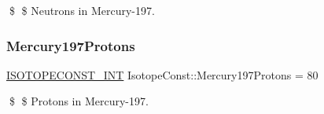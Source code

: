 \$ \$ Neutrons in Mercury-\/197. \mbox{\label{group___isotope_const-_mercury-_hg197_ga94a920436dfee781868e2ed3e0e59f0d}} 
\subsubsection{\texorpdfstring{Mercury197\+Protons}{Mercury197Protons}}
{\footnotesize\ttfamily \mbox{\hyperlink{group___isotope_const-_macros_ga5f18360b3e99483a35c32d789e62621c}{I\+S\+O\+T\+O\+P\+E\+C\+O\+N\+S\+T\+\_\+\+I\+NT}} Isotope\+Const\+::\+Mercury197\+Protons = 80}

\$ \$ Protons in Mercury-\/197. 